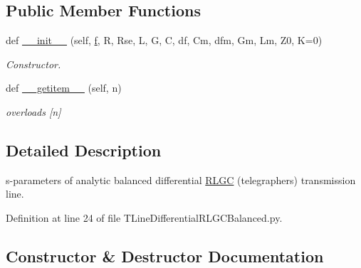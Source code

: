 \subsection*{Public Member Functions}
\begin{DoxyCompactItemize}
\item 
def \hyperlink{classSignalIntegrity_1_1SParameters_1_1Devices_1_1TLineDifferentialRLGCBalanced_1_1TLineDifferentialRLGCBalanced_a487b1dcd331b164ab28d7a15e7da47d0}{\+\_\+\+\_\+init\+\_\+\+\_\+} (self, \hyperlink{classSignalIntegrity_1_1SParameters_1_1SParameters_1_1SParameters_a32e7a34d6837fe949b413c852a0447f8}{f}, R, Rse, L, G, C, df, Cm, dfm, Gm, Lm, Z0, K=0)
\begin{DoxyCompactList}\small\item\em Constructor. \end{DoxyCompactList}\item 
def \hyperlink{classSignalIntegrity_1_1SParameters_1_1Devices_1_1TLineDifferentialRLGCBalanced_1_1TLineDifferentialRLGCBalanced_ab7a6da5139e0878b590d68292aaa70f2}{\+\_\+\+\_\+getitem\+\_\+\+\_\+} (self, n)
\begin{DoxyCompactList}\small\item\em overloads \mbox{[}n\mbox{]} \end{DoxyCompactList}\end{DoxyCompactItemize}


\subsection{Detailed Description}
s-\/parameters of analytic balanced differential \hyperlink{namespaceSignalIntegrity_1_1SParameters_1_1RLGC}{R\+L\+GC} (telegrapher\textquotesingle{}s) transmission line. 



Definition at line 24 of file T\+Line\+Differential\+R\+L\+G\+C\+Balanced.\+py.



\subsection{Constructor \& Destructor Documentation}
\mbox{\label{classSignalIntegrity_1_1SParameters_1_1Devices_1_1TLineDifferentialRLGCBalanced_1_1TLineDifferentialRLGCBalanced_a487b1dcd331b164ab28d7a15e7da47d0}} 
